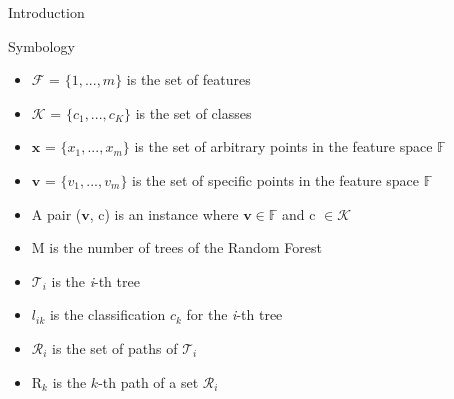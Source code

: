 \begin{frame}{Introduction}
    \begin{block}{Symbology}
        \begin{itemize}
            \item \(\mathcal{F}\) = \( \{ 1, ..., m \} \) is the set of features
            \item \(\mathcal{K}\) = \( \{ c_{1}, ..., c_{K} \} \) is the set of classes
            \item $\mathbf{x}$ = \( \{ x_{1}, ..., x_{m} \} \) is the set of arbitrary points in the feature space $\mathbb{F}$
            \item $\mathbf{v}$ = \( \{ v_{1}, ..., v_{m} \} \) is the set of specific points in the feature space $\mathbb{F}$
            \item A pair ($\mathbf{v}$, c) is an instance where $\mathbf{v} \in \mathbb{F}$ and c $\in \mathcal{K}$
            \item M is the number of trees of the Random Forest
            \item $\mathcal{T}_{i}$ is the \textit{i}-th tree
            \item $l_{ik}$ is the classification $c_{k}$ for the \textit{i}-th tree
            \item \(\mathcal{R}_{i}\) is the set of paths of \(\mathcal{T}_{i}\)
            \item R$_{k}$ is the $k$-th path of a set \(\mathcal{R}_{i}\)
        \end{itemize}
    \end{block}
\end{frame}